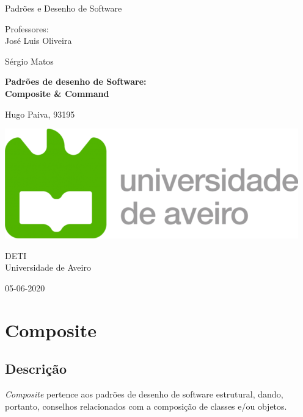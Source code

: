 \documentclass[10pt,portuguese]{article}
\begin{document}
\begin{titlepage}
	\clearpage\thispagestyle{empty}
	\centering
	\vspace{2cm}

	
	{\Large  Padrões e Desenho de Software \par}
	\vspace{0.5cm}
	{\small Professores: \\
	José Luis Oliveira\par
	Sérgio Matos\par}
	\vspace{4cm}
	{ \textbf{Padrões de desenho de Software:}} \\
	\vspace{0.5cm}
	{\Huge \textbf{Composite \& Command}} \\
	\vspace{1cm}
	\vspace{4cm}
	{\normalsize  Hugo Paiva, 93195
	   \par}
	 
	\vspace{2cm}

    \includegraphics[scale=0.20]{logo_ua.png}
    
    \vspace{2cm}
    
	{\normalsize DETI \\ 
		Universidade de Aveiro \par}
		
	{\normalsize 05-06-2020 \par}
	\vspace{2cm}
		
	
	\pagebreak

\end{titlepage}
\tableofcontents{}
\clearpage

\section{Composite}
\subsection{Descrição}
\par \textit{Composite} pertence aos padrões de desenho de software estrutural, dando, portanto, conselhos relacionados com a composição de classes e/ou objetos.
\end{document}
